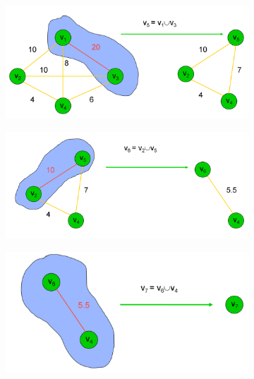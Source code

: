 \begin{figure}[h]
	\begin{center}
		\begin{subfigure}[b]{0.45\textwidth}
			\includegraphics[width=\textwidth]{images/Hierarchical_clustering_1.png}	
		\end{subfigure}
		\hfill
		\begin{subfigure}[b]{0.45\textwidth}
			\includegraphics[width=\textwidth]{images/Hierarchical_clustering_2.png}	
		\end{subfigure}
		\begin{subfigure}[b]{0.45\textwidth}
			\includegraphics[width=\textwidth]{images/Hierarchical_clustering_3.png}	
		\end{subfigure}

\end{center}
\end{figure}
